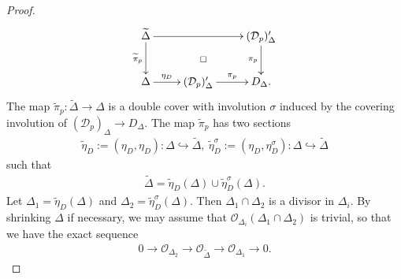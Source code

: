 \documentclass[11pt,oneside,a4paper,mathscr]{amsart}
\theoremstyle{definition}
\newcommand{\cD}{\mathcal{D}}
\begin{document}
\begin{proof}
\begin{align}
        \xymatrix{
\widetilde{\Delta} \ar[d]_-{\widetilde{\pi}_p} \ar[rr] \ar@{}[rrd]|\square & & (\cD_p)_{\Delta}' \ar[d]_-{\pi_p} \\
\Delta \ar[r]^-{\eta_D} & (\cD_p)_{\Delta}' \ar[r]^-{\pi_p} & D_{\Delta}.
        }
    \end{align}
The map $\widetilde{\pi}_p \colon \widetilde{\Delta} \to \Delta$ is a double cover 
with involution $\sigma$ induced by the covering involution of 
$(\cD_p)_{\Delta} \to D_{\Delta}$. 
The map $\widetilde{\pi}_p$ has two sections 
\begin{align*}
    \widetilde{\eta}_D:=(\eta_D, \eta_D) \colon \Delta \hookrightarrow \widetilde{\Delta}, \ 
     \widetilde{\eta}_D^{\sigma}:=(\eta_D, \eta_D^{\sigma}) \colon \Delta \hookrightarrow \widetilde{\Delta} 
\end{align*}
such that 
\begin{align*}\widetilde{\Delta}=\widetilde{\eta}_D(\Delta)\cup \widetilde{\eta}_D^{\sigma}(\Delta).\end{align*}
Let $\Delta_1=\widetilde{\eta}_D(\Delta)$
and $\Delta_2=\widetilde{\eta}^{\sigma}_D(\Delta)$. 
Then $\Delta_1 \cap \Delta_2$ is a divisor in $\Delta_i$. 
By shrinking 
$\Delta$ if necessary, we may assume that $\mathcal{O}_{\Delta_i}(\Delta_1 \cap \Delta_2)$ is trivial, so that we have the exact sequence 
\begin{align}\label{exact:sigma}
    0\to \mathcal{O}_{\Delta_2} \to \mathcal{O}_{\widetilde{\Delta}}
    \to \mathcal{O}_{\Delta_1} \to 0. 
\end{align}


\end{proof}
\end{document}
